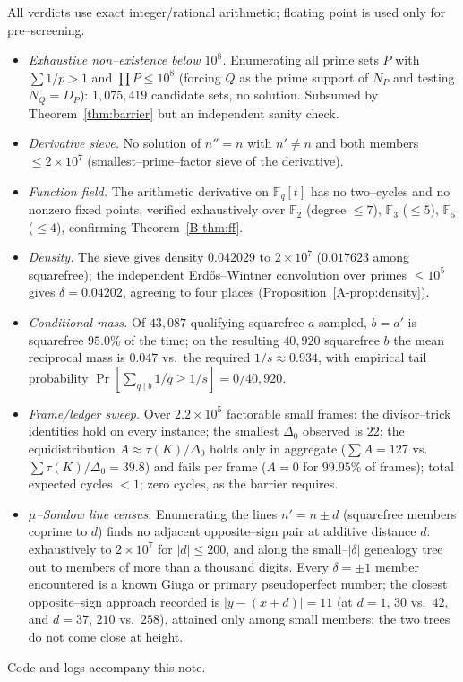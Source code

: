 \documentclass[11pt]{article}
\theoremstyle{definition}
\begin{document}
All verdicts use exact integer/rational arithmetic; floating point is used only for pre--screening.
\begin{itemize}[leftmargin=1.4em]
\item \emph{Exhaustive non--existence below $10^8$.} Enumerating all prime sets $P$ with
$\sum1/p>1$ and $\prod P\le10^8$ (forcing $Q$ as the prime support of $N_P$ and testing
$N_Q=D_P$): $1{,}075{,}419$ candidate sets, no solution. Subsumed by Theorem~\ref{thm:barrier} but an
independent sanity check.
\item \emph{Derivative sieve.} No solution of $n''=n$ with $n'\ne n$ and both members $\le
2\times10^7$ (smallest--prime--factor sieve of the derivative).
\item \emph{Function field.} The arithmetic derivative on $\mathbb{F}_q[t]$ has no two--cycles and no
nonzero fixed points, verified exhaustively over $\mathbb{F}_2$ (degree $\le7$), $\mathbb{F}_3$
($\le5$), $\mathbb{F}_5$ ($\le4$), confirming Theorem~\ref{B-thm:ff}.
\item \emph{Density.} The sieve gives density $0.042029$ to $2\times10^7$ ($0.017623$ among
squarefree); the independent Erd\H{o}s--Wintner convolution over primes $\le10^5$ gives
$\delta=0.04202$, agreeing to four places (Proposition~\ref{A-prop:density}).
\item \emph{Conditional mass.} Of $43{,}087$ qualifying squarefree $a$ sampled, $b=a'$ is squarefree
$95.0\%$ of the time; on the resulting $40{,}920$ squarefree $b$ the mean reciprocal mass is $0.047$
vs.\ the required $1/s\approx0.934$, with empirical tail probability $\Pr[\sum_{q\mid b}1/q\ge1/s]=
0/40{,}920$.
\item \emph{Frame/ledger sweep.} Over $2.2\times10^5$ factorable small frames: the divisor--trick
identities hold on every instance; the smallest $\Delta_0$ observed is $22$; the equidistribution
$A\approx\tau(K)/\Delta_0$ holds only in aggregate ($\sum A=127$ vs.\ $\sum\tau(K)/\Delta_0=39.8$)
and fails per frame ($A=0$ for $99.95\%$ of frames); total expected cycles $<1$; zero cycles, as the
barrier requires.
\item \emph{$\mu$--Sondow line census.} Enumerating the lines $n'=n\pm d$ (squarefree members coprime to
$d$) finds no adjacent opposite--sign pair at additive distance $d$: exhaustively to $2\times10^7$ for
$|d|\le200$, and along the small--$|\delta|$ genealogy tree out to members of more than a thousand digits.
Every $\delta=\pm1$ member encountered is a known Giuga or primary pseudoperfect number; the closest
opposite--sign approach recorded is $|y-(x+d)|=11$ (at $d=1$, $30$ vs.\ $42$, and $d=37$, $210$ vs.\ $258$),
attained only among small members; the two trees do not come close at height.
\end{itemize}
Code and logs accompany this note.
\end{document}
